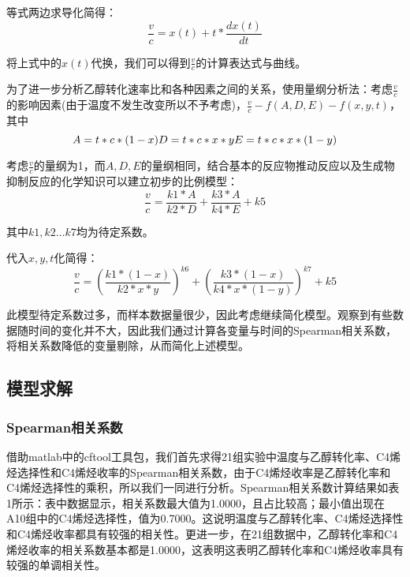 \documentclass[withoutpreface,bwprint]{cumcmthesis} %
\begin{document}
等式两边求导化简得：
\begin{equation}
	\frac{v}{c}=x(t)+t\ast\frac{dx(t)}{dt}
\end{equation}

将上式中的$x(t)$代换，我们可以得到$\frac{v}{c}$的计算表达式与曲线。

为了进一步分析乙醇转化速率比和各种因素之间的关系，使用量纲分析法：考虑$\frac{v}{c}$的影响因素(由于温度不发生改变所以不予考虑)，$\frac{v}{c}- f\left(A,D,E\right)-f(x,y,t)$，其中
\begin{equation*}
A=t\ast c\ast(1-x) \\
D=t\ast c\ast x\ast y \\
E=t\ast c\ast x\ast(1-y)
\end{equation*}

考虑$\frac{v}{c}$的量纲为1，而$A,D,E$的量纲相同，结合基本的反应物推动反应以及生成物抑制反应的化学知识可以建立初步的比例模型：
\begin{equation*}
\frac{v}{c}=\frac{k1\ast A}{k2\ast D}+\frac{k3\ast A}{k4\ast E}+k5
\end{equation*}

其中$k1,k2…k7$均为待定系数。

代入$x,y,t$化简得：
\begin{equation}
\frac{v}{c}=\left(\frac{k1\ast\left(1-x\right)}{k2\ast x\ast y}\right)^{k6}+\left(\frac{k3\ast\left(1-x\right)}{k4\ast x\ast\left(1-y\right)}\right)^{k7}+k5
\end{equation}

此模型待定系数过多，而样本数据量很少，因此考虑继续简化模型。观察到有些数据随时间的变化并不大，因此我们通过计算各变量与时间的Spearman相关系数，将相关系数降低的变量剔除，从而简化上述模型。


\subsection{模型求解}
\subsubsection{Spearman相关系数}
借助matlab中的cftool工具包，我们首先求得21组实验中温度与乙醇转化率、C4烯烃选择性和C4烯烃收率的Spearman相关系数，由于C4烯烃收率是乙醇转化率和C4烯烃选择性的乘积，所以我们一同进行分析。Spearman相关系数计算结果如表1所示：表中数据显示，相关系数最大值为1.0000，且占比较高；最小值出现在A10组中的C4烯烃选择性，值为0.7000。这说明温度与乙醇转化率、C4烯烃选择性和C4烯烃收率都具有较强的相关性。更进一步，在21组数据中，乙醇转化率和C4烯烃收率的相关系数基本都是1.0000，这表明这表明乙醇转化率和C4烯烃收率具有较强的单调相关性。
\end{document}
